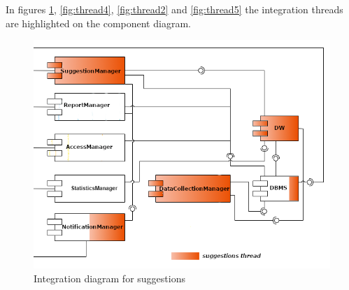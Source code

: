 \documentclass[a4paper]{report}
\begin{document}
In figures \ref{fig:thread3}, \ref{fig:thread4}, \ref{fig:thread2} and \ref{fig:thread5} the integration threads are highlighted on the component diagram.
\begin{figure}[htp]
\centering
\includegraphics[scale=2]{Thread3}
\caption{Integration diagram for suggestions}
\label{fig:thread3}
\end{figure}
\end{document}
